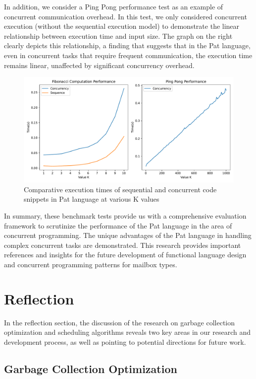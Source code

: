 \documentclass{l4proj}
\begin{document}
In addition, we consider a Ping Pong performance test as an example of concurrent communication overhead. In this test, we only considered concurrent execution (without the sequential execution model) to demonstrate the linear relationship between execution time and input size. The graph on the right clearly depicts this relationship, a finding that suggests that in the Pat language, even in concurrent tasks that require frequent communication, the execution time remains linear, unaffected by significant concurrency overhead.

\begin{figure}
    \centering
    \includegraphics[width=0.88\linewidth]{dissertation/images/benchmark.pdf}    
    \caption{ 
    Comparative execution times of sequential and concurrent code snippets in Pat language at various K values
    }
    \label{fig:benchmark} 
\end{figure}

In summary, these benchmark tests provide us with a comprehensive evaluation framework to scrutinize the performance of the Pat language in the area of concurrent programming. The unique advantages of the Pat language in handling complex concurrent tasks are demonstrated. This research provides important references and insights for the future development of functional language design and concurrent programming patterns for mailbox types.

\section{Reflection}
In the reflection section, the discussion of the research on garbage collection optimization and scheduling algorithms reveals two key areas in our research and development process, as well as pointing to potential directions for future work.

\subsection{Garbage Collection Optimization}
\end{document}
